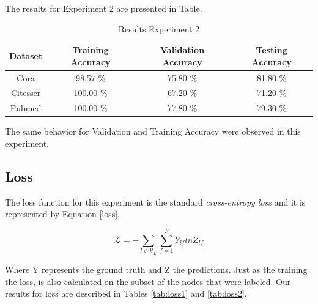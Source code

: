 The results for Experiment 2 are presented in Table.

\begin {table}[ht]
  \begin{center}
    \begin{tabular}{|c|c|c|c|}
    \hline
    Dataset    &  Training Accuracy & Validation Accuracy & Testing Accuracy\\ \hline
    Cora          & 98.57 \% & 75.80 \%  & 81.80 \% \\ 
    Citesser      & 100.00 \%& 67.20 \%  & 71.20 \% \\
    Pubmed        & 100.00 \%& 77.80 \%  & 79.30 \% \\
    \hline
    \end{tabular}
  \end{center}
\caption {Results Experiment 2} \label{tab:results2} 
\end{table}

The same behavior for Validation and Training Accuracy were observed in this experiment.

\subsection{Loss}

The loss function for this experiment is the standard \textit{cross-entropy loss} and it is represented by Equation \ref{loss}.

\begin{equation}
  \label{loss}
  \mathcal{L} = - \sum_{l \in \mathcal{Y}_{L}} \sum_{f=1}^{F} Y_{lf}lnZ_{lf}  
\end{equation}

Where Y represents the ground truth and Z the predictions. Just as the training the loss, is also calculated on the subset of the nodes that were labeled. Our results for loss are described in Tables \ref{tab:loss1} and \ref{tab:loss2}.

